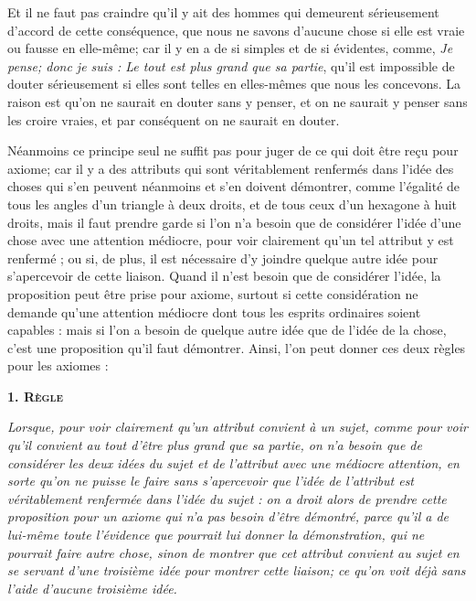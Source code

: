 Et il ne faut pas craindre qu'il y ait des hommes qui demeurent sérieusement d'accord de cette conséquence, que nous ne savons d'aucune chose si elle est vraie ou fausse en elle-même; car il y en a de si simples et de si évidentes, comme, \emph{Je pense; donc je suis : Le tout est plus grand que sa partie}, qu'il est impossible de douter sérieusement si elles sont telles en elles-mêmes que nous les concevons. La raison est qu'on ne saurait en douter sans y penser, et on ne saurait y penser sans les croire vraies, et par conséquent on ne saurait en douter.

Néanmoins ce principe seul ne suffit pas pour juger de ce qui doit être reçu pour axiome; car il y a des attributs qui sont véritablement renfermés dans l'idée des choses qui s'en peuvent néanmoins et s'en doivent démontrer, comme l'égalité de tous les angles d'un triangle à deux droits, et de tous ceux d'un hexagone à huit droits, mais il faut prendre garde si l'on n'a besoin que de considérer l'idée d'une chose avec une attention médiocre, pour voir clairement qu'un tel attribut y est renfermé ; ou si, de plus, il est nécessaire d'y joindre quelque autre idée pour s'apercevoir de cette liaison. Quand il n'est besoin que de considérer l'idée, la proposition peut être prise pour axiome, surtout si cette considération ne demande qu'une attention médiocre dont tous les esprits ordinaires soient capables : mais si l'on a besoin de quelque autre idée que de l'idée de la chose, c'est une proposition qu'il faut démontrer. Ainsi, l'on peut donner ces deux règles pour les axiomes :

\begin{center}{\scshape\bfseries\large 1. Règle}\end{center}

	\emph{Lorsque, pour voir clairement qu'un attribut convient à un sujet, comme pour voir qu'il convient au tout d'être plus grand que sa partie, on n'a besoin que de considérer les deux idées du sujet et de l'attribut avec une médiocre attention, en sorte qu'on ne puisse le faire sans s'apercevoir que l'idée de l'attribut est véritablement renfermée dans l'idée du sujet : on a droit alors de prendre cette proposition pour un axiome qui n'a pas besoin d'être démontré, parce qu'il a de lui-même toute l'évidence que pourrait lui donner la démonstration, qui ne pourrait faire autre chose, sinon de montrer que cet attribut convient au sujet en se servant d'une troisième idée pour montrer cette liaison; ce qu'on voit déjà sans l'aide d'aucune troisième idée.}

